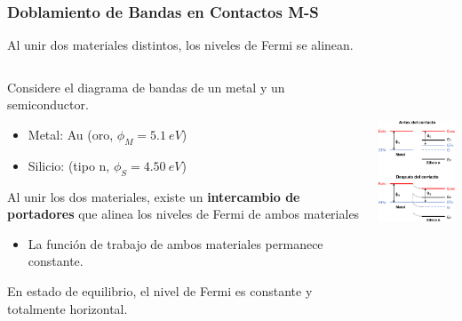 \documentclass[10pt,t,aspectratio=169]{beamer}
\begin{document}
\begin{frame}[t]
    \frametitle{Doblamiento de Bandas en Contactos M-S}

    \begin{tcolorbox}
        \centering
        Al unir dos materiales distintos, los niveles de Fermi se alinean.
    \end{tcolorbox}

    \begin{columns}
    
        \begin{column}{0.5\textwidth}
        
            Considere el diagrama de bandas de un metal y un semiconductor.

            \begin{itemize}
                \item Metal: Au (oro, $\phi_{M} = 5.1\ eV$)
                \item Silicio: (tipo n, $\phi_{S} = 4.50\ eV$)
            \end{itemize}

            \vspace{2mm}
            Al unir los dos materiales, existe un \textbf{intercambio de portadores} que alinea los niveles de Fermi de ambos materiales

            \begin{itemize}
                \item La función de trabajo de ambos materiales permanece constante.
            \end{itemize}
            
            \vspace{2mm}
            En estado de equilibrio, el nivel de Fermi es constante y totalmente horizontal.
            
        \end{column}
        
        \begin{column}{0.5\textwidth}
        
            \centering
            \includegraphics[height=5.5cm]{./figures/contacto-metal-silicio.pdf}
            
        \end{column}
        
    \end{columns}

\end{frame}
\end{document}
